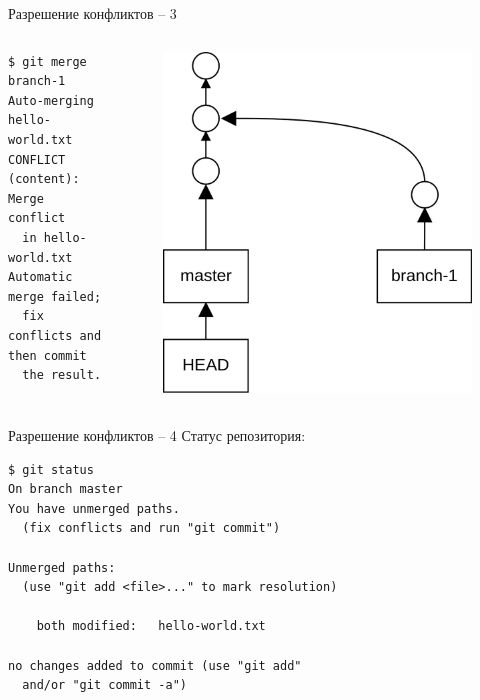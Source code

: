 \documentclass[presentation]{beamer}
\begin{document}
\begin{frame}[fragile]{Разрешение конфликтов -- 3}
  \begin{columns}
    \begin{column}{.6\textwidth}
\begin{verbatim}
$ git merge branch-1
Auto-merging hello-world.txt
CONFLICT (content): Merge conflict
  in hello-world.txt
Automatic merge failed;
  fix conflicts and then commit
  the result.
\end{verbatim}
      \end{column}
      \begin{column}{.4\textwidth}
        \begin{figure}[htb]
          \centering
          \includegraphics[height=.6\textheight]{git-operation-merge-2-1}
        \end{figure}
      \end{column}
    \end{columns}
\end{frame}

\begin{frame}[fragile]{Разрешение конфликтов -- 4}
  Статус репозитория:
\begin{verbatim}
$ git status
On branch master
You have unmerged paths.
  (fix conflicts and run "git commit")

Unmerged paths:
  (use "git add <file>..." to mark resolution)

	both modified:   hello-world.txt

no changes added to commit (use "git add"
  and/or "git commit -a")
\end{verbatim}
\end{frame}
\end{document}
